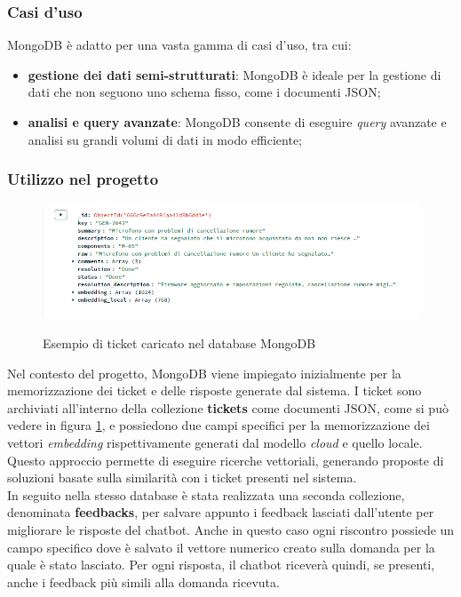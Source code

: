 \subsubsection{Casi d'uso}
MongoDB è adatto per una vasta gamma di casi d’uso, tra cui:
\begin{itemize}
    \item \textbf{gestione dei dati semi-strutturati}: MongoDB è ideale per la gestione di dati che non seguono uno schema fisso, come i documenti JSON;
    \item \textbf{analisi e query avanzate}: MongoDB consente di eseguire \textit{query} avanzate e analisi su grandi volumi di dati in modo efficiente;
\end{itemize}

\subsubsection{Utilizzo nel progetto}
\begin{figure}[H]
    \centering
    \includegraphics[alt={Esempio di documento salvato nel database}, width=1\columnwidth]{img/ticket_example.png}
    \caption{Esempio di ticket caricato nel database MongoDB}
    \label{fig:ticket-example}
\end{figure}

Nel contesto del progetto, MongoDB viene impiegato inizialmente per la memorizzazione dei ticket e delle risposte generate dal sistema. 
I ticket sono archiviati all’interno della collezione \textbf{tickets} come documenti JSON, come si può vedere in figura \ref{fig:ticket-example}, e possiedono due campi specifici per la memorizzazione dei vettori \textit{embedding} rispettivamente generati dal modello \textit{cloud} e quello locale.
Questo approccio permette di eseguire ricerche vettoriali, generando proposte di soluzioni basate sulla similarità con i ticket presenti nel sistema.\\
In seguito nella stesso database è stata realizzata una seconda collezione, denominata \textbf{feedbacks}, per salvare appunto i feedback lasciati dall’utente per migliorare le risposte del chatbot. Anche in questo caso ogni riscontro possiede un campo specifico dove è salvato il vettore numerico creato sulla domanda per la quale è stato lasciato. 
Per ogni risposta, il chatbot riceverà quindi, se presenti, anche i feedback più simili alla domanda ricevuta.


